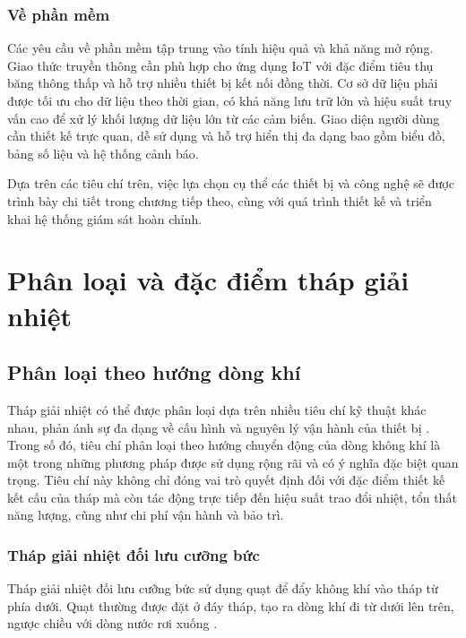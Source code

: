 \documentclass[../main.tex]{subfiles}
\begin{document}
\subsubsection{Về phần mềm}
Các yêu cầu về phần mềm tập trung vào tính hiệu quả và khả năng mở rộng. Giao thức truyền thông cần phù hợp cho ứng dụng IoT với đặc điểm tiêu thụ băng thông thấp và hỗ trợ nhiều thiết bị kết nối đồng thời. Cơ sở dữ liệu phải được tối ưu cho dữ liệu theo thời gian, có khả năng lưu trữ lớn và hiệu suất truy vấn cao để xử lý khối lượng dữ liệu lớn từ các cảm biến. Giao diện người dùng cần thiết kế trực quan, dễ sử dụng và hỗ trợ hiển thị đa dạng bao gồm biểu đồ, bảng số liệu và hệ thống cảnh báo.

Dựa trên các tiêu chí trên, việc lựa chọn cụ thể các thiết bị và công nghệ sẽ được trình bày chi tiết trong chương tiếp theo, cùng với quá trình thiết kế và triển khai hệ thống giám sát hoàn chỉnh.

\section{Phân loại và đặc điểm tháp giải nhiệt}
\label{sec:cooling_tower_classification}

\subsection{Phân loại theo hướng dòng khí}
\label{sec:classification_by_airflow}

Tháp giải nhiệt có thể được phân loại dựa trên nhiều tiêu chí kỹ thuật khác nhau, phản ánh sự đa dạng về cấu hình và nguyên lý vận hành của thiết bị \cite{cti_cooling_towers_2011}. Trong số đó, tiêu chí phân loại theo hướng chuyển động của dòng không khí là một trong những phương pháp được sử dụng rộng rãi và có ý nghĩa đặc biệt quan trọng. Tiêu chí này không chỉ đóng vai trò quyết định đối với đặc điểm thiết kế kết cấu của tháp mà còn tác động trực tiếp đến hiệu suất trao đổi nhiệt, tổn thất năng lượng, cũng như chi phí vận hành và bảo trì.

\subsubsection{Tháp giải nhiệt đối lưu cưỡng bức}
Tháp giải nhiệt đối lưu cưỡng bức sử dụng quạt để đẩy không khí vào tháp từ phía dưới. Quạt thường được đặt ở đáy tháp, tạo ra dòng khí đi từ dưới lên trên, ngược chiều với dòng nước rơi xuống \cite{johnson_mechanical_draft_2016}.
\end{document}

